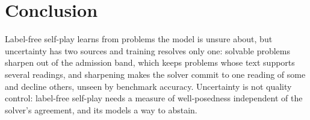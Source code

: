 \section{Conclusion}
\label{sec:conclusion}

Label-free self-play learns from problems the model is unsure about, but uncertainty has two sources and training resolves only one: solvable problems sharpen out of the admission band, which keeps problems whose text supports several readings, and sharpening makes the solver commit to one reading of some and decline others, unseen by benchmark accuracy. Uncertainty is not quality control: label-free self-play needs a measure of well-posedness independent of the solver's agreement, and its models a way to abstain.
